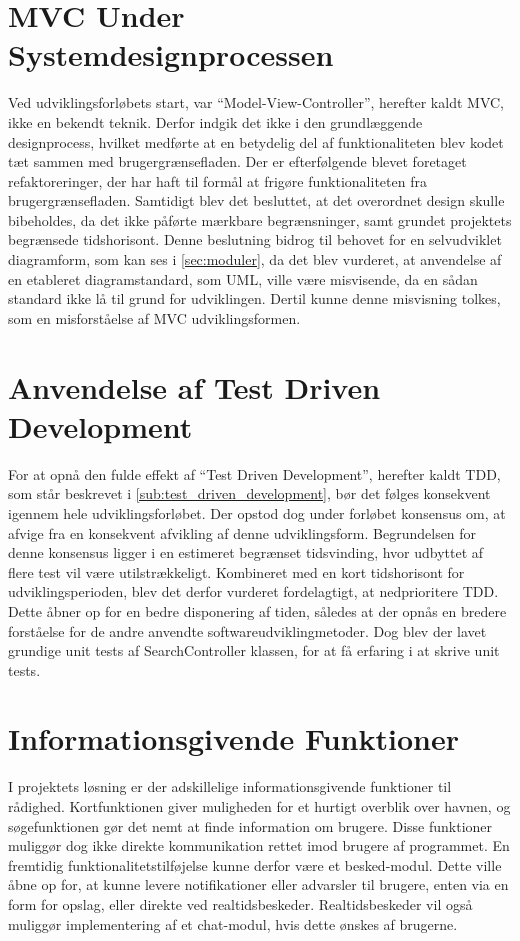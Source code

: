 \section{MVC Under Systemdesignprocessen}

Ved udviklingsforløbets start, var \enquote{Model-View-Controller}, herefter kaldt MVC, ikke en bekendt teknik. Derfor indgik det ikke i den grundlæggende designprocess, hvilket medførte at en betydelig del af funktionaliteten blev kodet tæt sammen med brugergrænsefladen. Der er efterfølgende blevet foretaget refaktoreringer, der har haft til formål at frigøre funktionaliteten fra brugergrænsefladen. Samtidigt blev det besluttet, at det overordnet design skulle bibeholdes, da det ikke påførte mærkbare begrænsninger, samt grundet projektets begrænsede tidshorisont. Denne beslutning bidrog til behovet for en selvudviklet diagramform, som kan ses i \cref{sec:moduler}, da det blev vurderet, at anvendelse af en etableret diagramstandard, som UML, ville være misvisende, da en sådan standard ikke lå til grund for udviklingen. Dertil kunne denne misvisning tolkes, som en misforståelse af MVC udviklingsformen.

\section{Anvendelse af Test Driven Development}

For at opnå den fulde effekt af \enquote{Test Driven Development}, herefter kaldt TDD, som står beskrevet i \cref{sub:test_driven_development}, bør det følges konsekvent igennem hele udviklingsforløbet. Der opstod dog under forløbet konsensus om, at afvige fra en konsekvent afvikling af denne udviklingsform. Begrundelsen for denne konsensus ligger i en estimeret begrænset tidsvinding, hvor udbyttet af flere test vil være utilstrækkeligt. Kombineret med en kort tidshorisont for udviklingsperioden, blev det derfor vurderet fordelagtigt, at nedprioritere TDD. Dette åbner op for en bedre disponering af tiden, således at der opnås en bredere forståelse for de andre anvendte softwareudviklingmetoder. Dog blev der lavet grundige unit tests af SearchController klassen, for at få erfaring i at skrive unit tests.

\section{Informationsgivende Funktioner}

I projektets løsning er der adskillelige informationsgivende funktioner til rådighed. Kortfunktionen giver muligheden for et hurtigt overblik over havnen, og søgefunktionen gør det nemt at finde information om brugere. Disse funktioner muliggør dog ikke direkte kommunikation rettet imod brugere af programmet. En fremtidig funktionalitetstilføjelse kunne derfor være et besked-modul. Dette ville åbne op for, at kunne levere notifikationer eller advarsler til brugere, enten via en form for opslag, eller direkte ved realtidsbeskeder. Realtidsbeskeder vil også muliggør implementering af et chat-modul, hvis dette ønskes af brugerne.